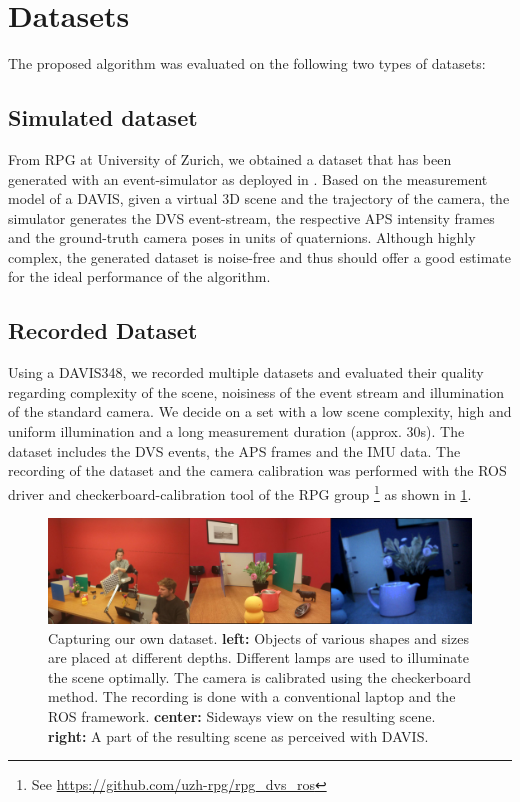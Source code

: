 \documentclass[10pt,twocolumn,letterpaper]{article}
\begin{document}
\section{Datasets}
The proposed algorithm was evaluated on the following two types of datasets: 
\subsection{Simulated dataset}

From RPG at University of Zurich, we obtained a dataset that has been generated with an event-simulator as deployed in \cite{simulator}. Based on the measurement model of a DAVIS, given a virtual 3D scene and the trajectory of the camera, the simulator generates the DVS event-stream, the respective APS intensity frames and the ground-truth camera poses in units of quaternions. Although highly complex, the generated dataset is noise-free and thus should offer a good estimate for the ideal performance of the algorithm. 

\subsection{Recorded Dataset}
Using a DAVIS348, we recorded multiple datasets and evaluated their quality regarding complexity of the scene, noisiness of the event stream and illumination of the standard camera. We decide on a set with a low scene complexity, high and uniform illumination and a long measurement duration (approx. 30s). 
The dataset includes the DVS events, the APS frames and the IMU data. The recording of the dataset and the camera calibration was performed with the ROS driver and checkerboard-calibration tool of the RPG group \footnote{See \url{https://github.com/uzh-rpg/rpg_dvs_ros}} as shown in \cref{fig:recording}. 
 
\begin{figure}[h!]
    \centering
    \includegraphics[width=1.0\linewidth]{figures/dataset_recording3.jpg}
        \caption{Capturing our own dataset. \textbf{left:} Objects of various shapes and sizes are placed at different depths. Different lamps are used to illuminate the scene optimally. The camera is calibrated using the checkerboard method. The recording is done with a conventional laptop and the ROS framework. \textbf{center:} Sideways view on the resulting scene. \textbf{right:} A part of the resulting scene as perceived with DAVIS.}
    \label{fig:recording}
\end{figure}
\end{document}
